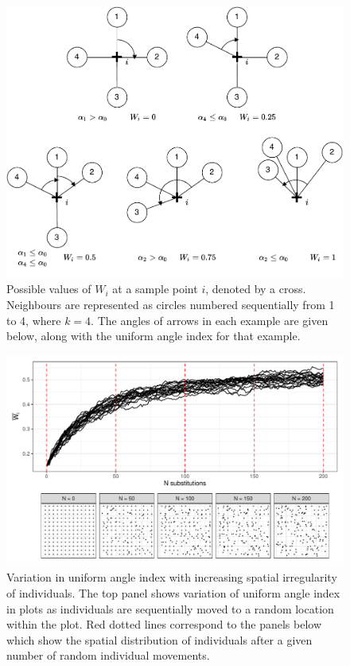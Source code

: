 \begin{refsection}
\begin{figure}
\centering
	\includegraphics[width=\linewidth]{img/winkelmass}
	\caption[Schematic diagram of uniform angle index values for different neighbourhood spatial patterns]{Possible values of $W_{i}$ at a sample point $i$, denoted by a cross. Neighbours are represented as circles numbered sequentially from 1 to 4, where $k = 4$. The angles of arrows in each example are given below, along with the uniform angle index for that example.}
	\label{workflow:winkelmass}
\end{figure}

\begin{figure}
\centering
	\includegraphics[width=\linewidth]{img/wi_diagram}
	\caption[Behaviour of the uniform angle index with increasing spatial irregularity of trees]{Variation in uniform angle index with increasing spatial irregularity of individuals. The top panel shows variation of uniform angle index in \wireps{} plots as individuals are sequentially moved to a random location within the plot. Red dotted lines correspond to the panels below which show the spatial distribution of individuals after a given number of random individual movements.}
	\label{workflow:wi_diagram}
\end{figure}


\end{refsection}
